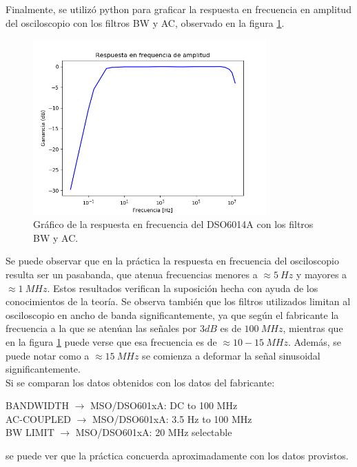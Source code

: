 \documentclass[a4paper]{article}
\begin{document}
Finalmente, se utilizó python para graficar la respuesta en frecuencia en amplitud del osciloscopio con los filtros BW y AC, observado en la figura \ref{graf:resp_freq_osci}.

\begin{figure}[H]
	\centering
	\includegraphics[width=0.8\textwidth]{resp_freq_osci.png}
	\caption{Gráfico de la respuesta en frecuencia del DSO6014A con los filtros BW y AC.} 
	\label{graf:resp_freq_osci}
\end{figure}

Se puede observar que en la práctica la respuesta en frecuencia del osciloscopio resulta ser un pasabanda, que atenua frecuencias menores a $\approx 5 \ Hz$ y mayores a $\approx 1 \ MHz$. Estos resultados verifican la suposición hecha con ayuda de los conocimientos de la teoría. Se observa también que los filtros utilizados limitan al osciloscopio en ancho de banda significantemente, ya que según el fabricante la frecuencia a la que se atenúan las señales por $3dB$ es de $100 \ MHz$, mientras que en la figura \ref{graf:resp_freq_osci} puede verse que esa frecuencia es de $\approx 10-15 \ MHz$. Además, se puede notar como a $\approx 15 \ MHz$ se comienza a deformar la señal sinusoidal significantemente.\\

Si se comparan los datos obtenidos con los datos del fabricante:
\begin{center}
BANDWIDTH $\rightarrow$ MSO/DSO601xA: DC to 100 MHz\\
AC-COUPLED $\rightarrow$ MSO/DSO601xA: 3.5 Hz to 100 MHz\\
BW LIMIT $\rightarrow$ MSO/DSO601xA: 20 MHz selectable\\
\end{center}
se puede ver que la práctica concuerda aproximadamente con los datos provistos.
\end{document}
